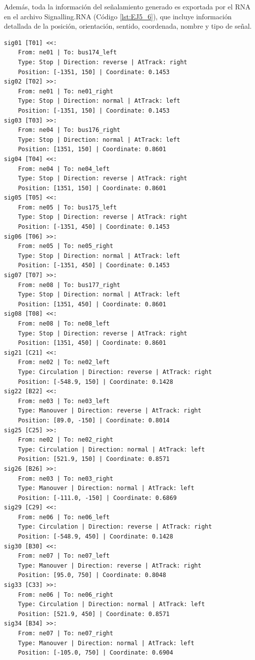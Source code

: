 	Además, toda la información del señalamiento generado es exportada por el RNA en el archivo Signalling.RNA (Código \ref{lst:EJ5_6}), que incluye información detallada de la posición, orientación, sentido, coordenada, nombre y tipo de señal.
	
	\begin{lstlisting}[language = {}, caption = Signalling.RNA, label = {lst:EJ5_6}]
sig01 [T01] <<:
	From: ne01 | To: bus174_left
	Type: Stop | Direction: reverse | AtTrack: right 
	Position: [-1351, 150] | Coordinate: 0.1453
sig02 [T02] >>:
	From: ne01 | To: ne01_right
	Type: Stop | Direction: normal | AtTrack: left 
	Position: [-1351, 150] | Coordinate: 0.1453
sig03 [T03] >>:
	From: ne04 | To: bus176_right
	Type: Stop | Direction: normal | AtTrack: left 
	Position: [1351, 150] | Coordinate: 0.8601
sig04 [T04] <<:
	From: ne04 | To: ne04_left
	Type: Stop | Direction: reverse | AtTrack: right 
	Position: [1351, 150] | Coordinate: 0.8601
sig05 [T05] <<:
	From: ne05 | To: bus175_left
	Type: Stop | Direction: reverse | AtTrack: right 
	Position: [-1351, 450] | Coordinate: 0.1453
sig06 [T06] >>:
	From: ne05 | To: ne05_right
	Type: Stop | Direction: normal | AtTrack: left 
	Position: [-1351, 450] | Coordinate: 0.1453
sig07 [T07] >>:
	From: ne08 | To: bus177_right
	Type: Stop | Direction: normal | AtTrack: left 
	Position: [1351, 450] | Coordinate: 0.8601
sig08 [T08] <<:
	From: ne08 | To: ne08_left
	Type: Stop | Direction: reverse | AtTrack: right 
	Position: [1351, 450] | Coordinate: 0.8601
sig21 [C21] <<:
	From: ne02 | To: ne02_left
	Type: Circulation | Direction: reverse | AtTrack: right 
	Position: [-548.9, 150] | Coordinate: 0.1428
sig22 [B22] <<:
	From: ne03 | To: ne03_left
	Type: Manouver | Direction: reverse | AtTrack: right 
	Position: [89.0, -150] | Coordinate: 0.8014
sig25 [C25] >>:
	From: ne02 | To: ne02_right
	Type: Circulation | Direction: normal | AtTrack: left 
	Position: [521.9, 150] | Coordinate: 0.8571
sig26 [B26] >>:
	From: ne03 | To: ne03_right
	Type: Manouver | Direction: normal | AtTrack: left 
	Position: [-111.0, -150] | Coordinate: 0.6869
sig29 [C29] <<:
	From: ne06 | To: ne06_left
	Type: Circulation | Direction: reverse | AtTrack: right 
	Position: [-548.9, 450] | Coordinate: 0.1428
sig30 [B30] <<:
	From: ne07 | To: ne07_left
	Type: Manouver | Direction: reverse | AtTrack: right 
	Position: [95.0, 750] | Coordinate: 0.8048
sig33 [C33] >>:
	From: ne06 | To: ne06_right
	Type: Circulation | Direction: normal | AtTrack: left 
	Position: [521.9, 450] | Coordinate: 0.8571
sig34 [B34] >>:
	From: ne07 | To: ne07_right
	Type: Manouver | Direction: normal | AtTrack: left 
	Position: [-105.0, 750] | Coordinate: 0.6904
	\end{lstlisting}	
	
